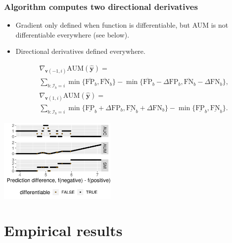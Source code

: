 \documentclass{beamer}
\begin{document}
\begin{frame}
  \frametitle{Algorithm computes two directional derivatives }

  \begin{itemize}
  \item Gradient only defined when function is differentiable, but AUM
    is not differentiable everywhere (see below).
  \item Directional derivatives defined everywhere.
  \end{itemize}
\begin{eqnarray*}
  &&\nabla_{\mathbf v(-1,i)} \text{AUM}(\mathbf{\hat y}) = \\
  &&\sum_{b: \mathcal I_b = i}
  \min\{
  \overline{\text{FP}}_b , 
  \overline{\text{FN}}_b 
  \}
  -
  \min\{
  \overline{\text{FP}}_b - \Delta\text{FP}_b, 
  \overline{\text{FN}}_b - \Delta\text{FN}_b
  \},\\
  &&\nabla_{\mathbf v(1,i)} \text{AUM}(\mathbf{\hat y}) = \\
  &&\sum_{b: \mathcal I_b = i}
  \min\{
  \underline{\text{FP}}_b + \Delta\text{FP}_b, 
  \underline{\text{FN}}_b + \Delta\text{FN}_b
  \}
  -
  \min\{
  \underline{\text{FP}}_b , 
  \underline{\text{FN}}_b 
     \}.
\end{eqnarray*}  

  \includegraphics[height=1.6in]{figure-aum-convexity}

\end{frame}


\section{Empirical results}
\end{document}
